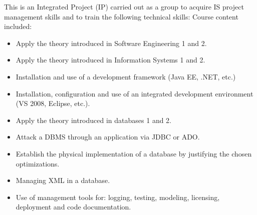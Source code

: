 This is an Integrated Project (IP) carried out as a group to acquire IS project management skills and to train the following technical skills:
Course content included:
\begin{itemize}
    \item Apply the theory introduced in Software Engineering 1 and 2.
    \item Apply the theory introduced in Information Systems 1 and 2.
    \item Installation and use of a development framework (Java EE, .NET, etc.)
    \item Installation, configuration and use of an integrated development environment (VS 2008, Eclipse, etc.).
    \item Apply the theory introduced in databases 1 and 2.
    \item Attack a DBMS through an application via JDBC or ADO.
    \item Establish the physical implementation of a database by justifying the chosen optimizations.
    \item Managing XML in a database.
    \item Use of management tools for: logging, testing, modeling, licensing, deployment and code documentation.
\end{itemize}